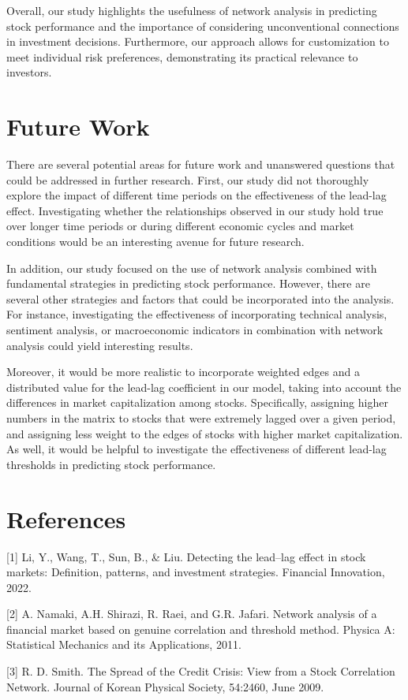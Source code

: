 \documentclass{article}
\begin{document}
Overall, our study highlights the usefulness of network analysis in predicting stock performance and the importance of considering unconventional connections in investment decisions. Furthermore, our approach allows for customization to meet individual risk preferences, demonstrating its practical relevance to investors.

\section{Future Work}
There are several potential areas for future work and unanswered questions that could be addressed in further research. First, our study did not thoroughly explore the impact of different time periods on the effectiveness of the lead-lag effect. Investigating whether the relationships observed in our study hold true over longer time periods or during different economic cycles and market conditions would be an interesting avenue for future research.

In addition, our study focused on the use of network analysis combined with fundamental strategies in predicting stock performance. However, there are several other strategies and factors that could be incorporated into the analysis. For instance, investigating the effectiveness of incorporating technical analysis, sentiment analysis, or macroeconomic indicators in combination with network analysis could yield interesting results. 

Moreover, it would be more realistic to incorporate weighted edges and a distributed value for the lead-lag coefficient in our model, taking into account the differences in market capitalization among stocks. Specifically, assigning higher numbers in the matrix to stocks that were extremely lagged over a given period, and assigning less weight to the edges of stocks with higher market capitalization. As well, it would be helpful to investigate the effectiveness of different lead-lag thresholds in predicting stock performance.

\section*{References}
[1] Li, Y., Wang, T., Sun, B., \& Liu. Detecting the lead–lag effect in stock markets: Definition, patterns, and investment strategies. Financial Innovation, 2022.

[2] A. Namaki, A.H. Shirazi, R. Raei, and G.R. Jafari. Network analysis of a financial market based on genuine correlation and threshold method. Physica A: Statistical
Mechanics and its Applications, 2011.

[3] R. D. Smith. The Spread of the Credit Crisis: View
from a Stock Correlation Network. Journal of Korean
Physical Society, 54:2460, June 2009.

\medskip
\small
\end{document}
